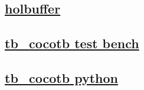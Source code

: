 \documentclass{article}
\begin{document}
  


  \subsection{\href{../files/holdbuffer-v.html}{holbuffer}}
  \subsection{\href{../files2/tb_cocotb-v.html}{tb\_cocotb test bench}}
  \subsection{\href{../files2/tb_cocotb-py.html}{tb\_cocotb python}}
\end{document}
